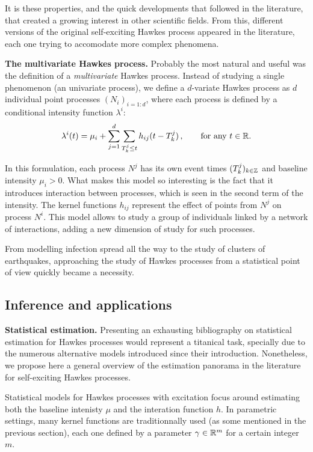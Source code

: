     It is these properties, and the quick developments that followed in the literature, that created a growing interest in other scientific fields.
    From this, different versions of the original self-exciting Hawkes process appeared in the literature, each one trying to accomodate more complex phenomena.

    \textbf{The multivariate Hawkes process.} Probably the most natural and useful was the definition of a \emph{multivariate} Hawkes process. 
    Instead of studying a single phenomenon (an univariate process), we define a $d$-variate Hawkes process as $d$ individual point processes $(N_i)_{i=1:d}$, 
    where each process is defined by a conditional intensity function $\lambda^i$:
    \[\lambda^i(t) = \mu_i + \sum_{j=1}^{d}\sum_{T_k^j \leq t}{h_{ij}(t-T_k^j)}\,, \qquad \text{for any $t\in{\mathbb R}$.}\]

    In this formulation, each process $N^j$ has its own event times $(T_k^j)_{k\in{\mathbb Z}}$ and baseline intensity $\mu_i > 0$.
    What makes this model so interesting is the fact that it introduces interaction between processes, which is seen in the second term of the intensity.
    The kernel functions $h_{ij}$ represent the effect of points from $N^j$ on process $N^i$.
    This model allows to study a group of individuals linked by a network of interactions, adding a new dimension of study for such processes.

    From modelling infection spread all the way to the study of clusters of earthquakes, approaching the study of Hawkes processes from a statistical point of view quickly became a necessity.

    \subsection{Inference and applications}

    \textbf{Statistical estimation.}
    Presenting an exhausting bibliography on statistical estimation for Hawkes processes would represent a titanical task, 
    specially due to the numerous alternative models introduced since their introduction.
    Nonetheless, we propose here a general overview of the estimation panorama in the literature for self-exciting Hawkes processes.
    
    Statistical models for Hawkes processes with excitation focus around estimating both the baseline intenisty $\mu$ and the interation function $h$.
    In parametric settings, many kernel functions are traditionnally used (as some mentioned in the previous section),
    each one defined by a parameter $\gamma\in{\mathbb R}^m$ for a certain integer $m$.

